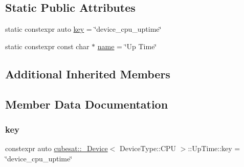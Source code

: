 \subsection*{Static Public Attributes}
\begin{DoxyCompactItemize}
\item 
static constexpr auto \hyperlink{structcubesat_1_1__Device_3_01DeviceType_1_1CPU_01_4_1_1UpTime_a006c086d3cdd97c3b917dd5c8609e760}{key} = \char`\"{}device\+\_\+cpu\+\_\+uptime\char`\"{}
\item 
static constexpr const char $\ast$ \hyperlink{structcubesat_1_1__Device_3_01DeviceType_1_1CPU_01_4_1_1UpTime_a4f83872ba6bed06b34c4ed38845ccda9}{name} = \char`\"{}Up Time\char`\"{}
\end{DoxyCompactItemize}
\subsection*{Additional Inherited Members}


\subsection{Member Data Documentation}
\mbox{\label{structcubesat_1_1__Device_3_01DeviceType_1_1CPU_01_4_1_1UpTime_a006c086d3cdd97c3b917dd5c8609e760}} 
\subsubsection{\texorpdfstring{key}{key}}
{\footnotesize\ttfamily constexpr auto \hyperlink{structcubesat_1_1__Device}{cubesat\+::\+\_\+\+Device}$<$ Device\+Type\+::\+C\+PU $>$\+::Up\+Time\+::key = \char`\"{}device\+\_\+cpu\+\_\+uptime\char`\"{}\hspace{0.3cm}{\ttfamily [static]}}

\mbox{\label{structcubesat_1_1__Device_3_01DeviceType_1_1CPU_01_4_1_1UpTime_a4f83872ba6bed06b34c4ed38845ccda9}} 
